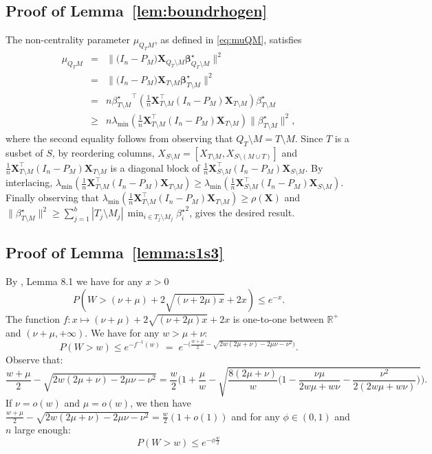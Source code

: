 \documentclass[aos]{imsart}
\theoremstyle{plain}
\newcommand{\R}{\mathbb{R}}
\newcommand{\bs}{\boldsymbol}
\begin{document}
\subsection{Proof of Lemma~\ref{lem:boundrhogen}} 
The non-centrality parameter $\mu_{Q_TM}$, as defined in \eqref{eq:muQM}, satisfies
\begin{eqnarray*}
    \mu_{Q_TM}&=&\|\big(I_n-P_M\big) \bs X_{Q_T\setminus M} \bs \beta^{\star}_{Q_T\setminus M}\|^2\\
    &=&\|\big(I_n-P_M\big) \bs X_{T\setminus M} \bs \beta^{\star}_{T\setminus M}\|^2\\
    &= & n {\beta^{\star}_{T\setminus M}}^\top \left(\tfrac1n \bs X_{T\setminus M}^\top(I_n-P_M)\bs X_{T\setminus M}\right)\beta^{\star}_{T\setminus M}\\
    &\geq & n\lambda_{\min}\left(\tfrac1n \bs X_{T\setminus M}^\top(I_n-P_M)\bs X_{T\setminus M}\right)\|\beta^{\star}_{T\setminus M}\|^2,
\end{eqnarray*}
where the second equality follows from observing that $Q_T\setminus M=T\setminus M$. Since $T$ is a susbet of $S$, by reordering columns, $X_{S\setminus M}=[X_{T\setminus M},X_{S\setminus (M\cup T)}]$ and $\tfrac1n \bs X_{T\setminus M}^\top(I_n-P_M)\bs X_{T\setminus M}$ is a diagonal block of $\tfrac1n \bs X_{S\setminus M}^\top(I_n-P_M)\bs X_{S\setminus M}$. By interlacing, $\lambda_{\min}\left(\tfrac1n \bs X_{T\setminus M}^\top(I_n-P_M)\bs X_{T\setminus M}\right) \geq \lambda_{\min}\left(\tfrac1n \bs X_{S\setminus M}^\top(I_n-P_M)\bs X_{S\setminus M}\right)$. Finally observing that 
$\lambda_{\min}\left(\tfrac1n \bs X_{T\setminus M}^\top(I_n-P_M)\bs X_{T\setminus M}\right) \geq \rho(\bs X)$ and $\|\beta^{\star}_{T\setminus M}\|^2\geq \sum_{j=1}^b|T_j\setminus M_j|\,\min_{i\in T_j\setminus M_j}{\beta_{i}^{\star}}^2$, gives the desired result.

\subsection{Proof of Lemma~\ref{lemma:s1s3}}
By \cite{birge}, Lemma 8.1 we have for any $x>0$
$$P(W> (\nu+\mu)+2 \sqrt{(\nu+2 \mu) x}+2 x) \leq e^{-x}.$$
The function $f:x\mapsto (\nu+\mu)+2 \sqrt{(\nu+2 \mu) x}+2 x$ is  one-to-one between $\R^+$ and $( \nu+
\mu,+\infty)$. 
We have for any $w>\mu+\nu$:
$$P(W > w) \leq e^{-f^{-1}(w)} \:=\; e^{-\big(\frac{w+\mu}{2}  - \sqrt{2w(2 \mu+\nu)-2 \mu \nu - \nu^2 }\big) } .$$
Observe that:
$$\frac{w+\mu}{2}  - \sqrt{2w( 2 \mu+ \nu)-2 \mu \nu - \nu^2 }= \frac{w}{2}\bigg(1+\frac{\mu}{w} -\sqrt{\frac{8(2 \mu+\nu)}{w}\bigg(1-\frac{\nu\mu}{2w\mu+w\nu}-\frac{\nu^2}{2(2w\mu+w\nu)} \bigg)}\bigg).$$
 If $\nu=o(w)$ and $\mu=o(w)$, we then have $\frac{w+\mu}{2}  - \sqrt{2w( 2 \mu+ \nu)-2 \mu \nu - \nu^2 }= \frac{w}{2}(1+o(1))$ and for any $\phi\in(0,1)$ and $n$ large enough:
$$P(W > w) \leq  e^{-\phi\frac{w}{2}}$$
\end{document}
